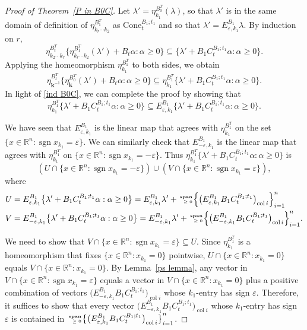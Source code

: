 \documentclass{amsart}
\theoremstyle{definition}
\theoremstyle{remark}
\numberwithin{equation}{section}
\newcommand{\reals}{\mathbb R}
\newcommand{\ep}{\varepsilon}
\newcommand{\col}{\operatorname{col}}
\newcommand{\sgn}{\operatorname{sgn}}
\newcommand{\nnspan}{{\!\!\tiny\begin{array}{r}\mathbf{span}\\\ge0\end{array}\hspace*{-0.57em}}}
\newcommand{\set}[1]{{\lbrace #1 \rbrace}}
\newcommand{\sett}[1]{{\bigl\lbrace #1 \bigr\rbrace}}
\newcommand{\settt}[1]{{\Bigl\lbrace #1 \Bigr\rbrace}}
\newcommand{\0}{{\mathbf{0}}}
\newcommand{\Cone}{\mathrm{Cone}}
\newcommand{\kk}{{\boldsymbol{k}}}
\begin{document}
\begin{proof}[Proof of Theorem~\ref{P in B0C}]
Let $\lambda'=\eta_{k_1}^{B_0^T}(\lambda)$, so that $\lambda'$ is in the same domain of definition of $\eta_{k_r\cdots k_2}^{B_1^T}$ as $\Cone_t^{B_1;t_1}$ and so that $\lambda'=E^{B_1}_{\ep,k_1}\lambda$.
By induction on $r$, 
\[\eta_{k_2\cdots k_r}^{B_t^T}\set{\eta_{k_r\cdots k_2}^{B_1^T}(\lambda')+B_t\alpha:\alpha\ge0}\subseteq\set{\lambda'+B_1C_t^{B_1;t_1}\alpha:\alpha\ge0}.\]
Applying the homeomorphism $\eta_{k_1}^{B_1^T}$ to both sides, we obtain
\[\eta_{\kk^{-1}}^{B_t^T}\set{\eta_\kk^{B_0^T}(\lambda')+B_t\alpha:\alpha\ge0}\subseteq\eta_{k_1}^{B_1^T}\set{\lambda'+B_1C_t^{B_1;t_1}\alpha:\alpha\ge0}.\]
In light of \eqref{ind B0C}, we can complete the proof by showing that
\[\eta_{k_1}^{B_1^T}\sett{\lambda'+B_1C_t^{B_1;t_1}\alpha:\alpha\ge0}\subseteq E^{B_1}_{\ep,k_1}\sett{\lambda'+B_1C_t^{B_1;t_1}\alpha:\alpha\ge0}.\]

We have seen that $E^{B_1}_{\ep,k_1}$ is the linear map that agrees with $\eta_{k_1}^{B_1^T}$ on the set $\set{x\in\reals^n:\sgn x_{k_1}=\ep}$.
We can similarly check that $E^{B_1}_{-\ep,k_1}$ is the linear map that agrees with $\eta_{k_1}^{B_1^T}$ on $\set{x\in\reals^n:\sgn x_{k_1}=-\ep}$.
Thus $\eta_{k_1}^{B_1^T}\set{\lambda'+B_1C_t^{B_1;t_1}\alpha:\alpha\ge0}$ is
\[(U\cap\set{x\in\reals^n:\sgn x_{k_1}=-\ep})\cup(V\cap\set{x\in\reals^n:\sgn x_{k_1}=\ep}),\]
where %
{\small
\begin{align*}
U&=E^{B_1}_{\ep,k_1}\sett{\lambda'+B_1C_t^{B_1;t_1}\alpha:\alpha\ge0}=E^{B_1}_{\ep,k_1}\lambda'+\nnspan\settt{\bigl(E^{B_1}_{\ep,k_1}B_1C_t^{B_1;t_1}\bigr)_{\col i}}_{i=1}^n\\
V&=E^{B_1}_{-\ep,k_1}\sett{\lambda'+B_1C_t^{B_1;t_1}\alpha:\alpha\ge0}=E^{B_1}_{-\ep,k_1}\lambda'+\nnspan\settt{\bigl(E^{B_1}_{-\ep,k_1}B_1C_t^{B_1;t_1}\bigr)_{\col i}}_{i=1}^n.
\end{align*}
}

We need to show that $V\cap\set{x\in\reals^n:\sgn x_{k_1}=\ep}\subseteq U$.
Since $\eta_{k_1}^{B_1^T}$ is a homeomorphism that fixes $\set{x\in\reals^n:x_{k_1}=0}$ pointwise, $U\cap\set{x\in\reals^n:x_{k_1}=0}$ equals $V\cap\set{x\in\reals^n:x_{k_1}=0}$.
By Lemma~\ref{ps lemma}, any vector in $V\cap\set{x\in\reals^n:\sgn x_{k_1}=\ep}$ equals a vector in $V\cap\set{x\in\reals^n:x_{k_1}=0}$ plus a positive combination of vectors $\bigl(E^{B_1}_{-\ep,k_1}B_1C_t^{B_1;t_1}\bigr)_{\col i}$ whose $k_1$-entry has sign $\ep$.
Therefore, it suffices to show that every vector $\bigl(E^{B_1}_{-\ep,k_1}B_1C_t^{B_1;t_1}\bigr)_{\col i}$ whose $k_1$-entry has sign~$\ep$ is contained in $\nnspan\sett{\bigl(E^{B_1}_{\ep,k_1}B_1C_t^{B_1;t_1}\bigr)_{\col i}}_{i=1}^n$.


\end{proof}
\end{document}

